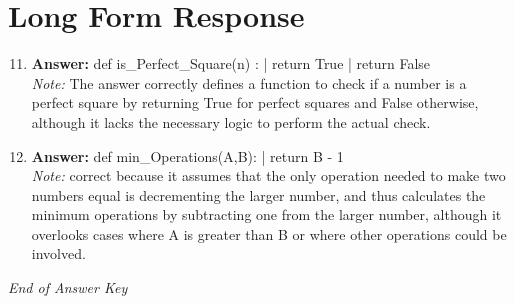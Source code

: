 \documentclass[12pt]{article}
\begin{document}
\section*{Long Form Response}
\begin{enumerate}[label=\arabic*.]
\setcounter{enumi}{10}
\item \textbf{Answer:} def is\_Perfect\_Square(n) : | return True | return False
\\ \textit{Note:} The answer correctly defines a function to check if a number is a perfect square by returning True for perfect squares and False otherwise, although it lacks the necessary logic to perform the actual check.
\item \textbf{Answer:} def min\_Operations(A,B): | return B - 1
\\ \textit{Note:} correct because it assumes that the only operation needed to make two numbers equal is decrementing the larger number, and thus calculates the minimum operations by subtracting one from the larger number, although it overlooks cases where A is greater than B or where other operations could be involved.
\end{enumerate}

\vfill
\noindent\textit{End of Answer Key}
\end{document}
